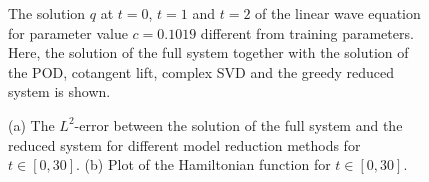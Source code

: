 \begin{figure}
\caption{The solution $q$ at $t=0$, $t=1$ and $t=2$ of the linear wave equation for parameter value $c= 0.1019$ different from training parameters. Here, the solution of the full system together with the solution of the POD, cotangent lift, complex SVD and the greedy reduced system is shown.}
\label{fig:NuRe:1}
\end{figure}

\begin{figure}

\begin{minipage}{.5\linewidth}
\centering
{}
\end{minipage}%
\begin{minipage}{.5\linewidth}
\centering
{}
\end{minipage}\par\medskip
\centering

\caption{{\edit (a) The $L^2$-error between the solution of the full system and the reduced system for different model reduction methods for $t \in [0,30]$.} (b) Plot of the Hamiltonian function for $t \in [0,30]$. }
\label{fig:NuRe:2}
\end{figure}




